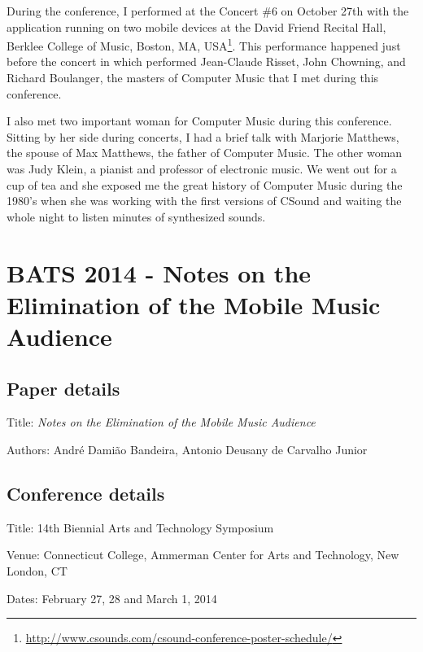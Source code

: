 During the conference, I performed at the Concert \#6 on October 27th with the application running on two mobile devices at the David Friend Recital Hall, Berklee College of Music, Boston, MA, USA\footnote{\url{http://www.csounds.com/csound-conference-poster-schedule/}}.
This performance happened just before the concert in which performed Jean-Claude Risset, John Chowning, and Richard Boulanger, the masters of Computer Music that I met during this conference.

I also met two important woman for Computer Music during this conference.
Sitting by her side during concerts, I had a brief talk with Marjorie Matthews, the spouse of Max Matthews, the father of Computer Music.
The other woman was Judy Klein, a pianist and professor of electronic music.
We went out for a cup of tea and she exposed me the great history of Computer Music during the 1980's when she was working with the first versions of CSound and waiting the whole night to listen minutes of synthesized sounds.



\section{BATS 2014 - Notes on the Elimination of the Mobile Music Audience}
\label{ape:paperbats2014}

\subsection*{Paper details}

Title: \textit{Notes on the Elimination of the Mobile Music Audience}

Authors: André Damião Bandeira, Antonio Deusany de Carvalho Junior

\subsection*{Conference details}

Title: 14th Biennial Arts and Technology Symposium

Venue: Connecticut College, Ammerman Center for Arts and Technology, New London, CT

Dates: February 27, 28 and March 1, 2014



